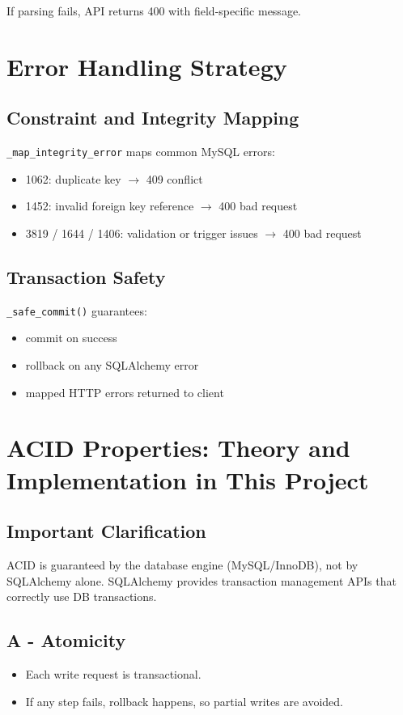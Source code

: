 \documentclass[11pt,a4paper]{article}
\begin{document}
If parsing fails, API returns 400 with field-specific message.

\section{Error Handling Strategy}
\subsection{Constraint and Integrity Mapping}
\texttt{\_map\_integrity\_error} maps common MySQL errors:
\begin{itemize}
  \item 1062: duplicate key \(\rightarrow\) 409 conflict
  \item 1452: invalid foreign key reference \(\rightarrow\) 400 bad request
  \item 3819 / 1644 / 1406: validation or trigger issues \(\rightarrow\) 400 bad request
\end{itemize}

\subsection{Transaction Safety}
\texttt{\_safe\_commit()} guarantees:
\begin{itemize}
  \item commit on success
  \item rollback on any SQLAlchemy error
  \item mapped HTTP errors returned to client
\end{itemize}

\section{ACID Properties: Theory and Implementation in This Project}
\subsection{Important Clarification}
ACID is guaranteed by the database engine (MySQL/InnoDB), not by SQLAlchemy alone. SQLAlchemy provides transaction management APIs that correctly use DB transactions.

\subsection{A - Atomicity}
\begin{itemize}
  \item Each write request is transactional.
  \item If any step fails, rollback happens, so partial writes are avoided.
\end{itemize}
\end{document}
